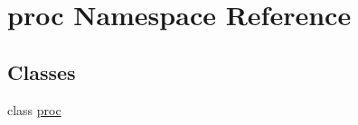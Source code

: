 \hypertarget{namespaceproc}{
\section{proc Namespace Reference}
\label{namespaceproc}
}
\subsection*{Classes}
\begin{DoxyCompactItemize}
\item 
class \hyperlink{classproc_1_1proc}{proc}
\end{DoxyCompactItemize}
